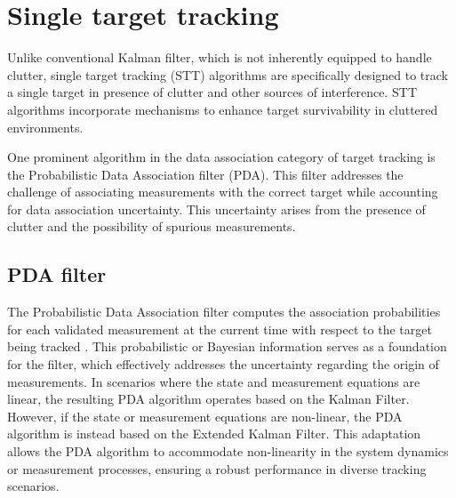 \section{Single target tracking}
Unlike conventional Kalman filter, which is not inherently equipped to handle clutter, single target tracking (STT) algorithms are specifically designed to track a single target in presence of clutter and other
sources
of interference. STT algorithms incorporate mechanisms to enhance target survivability in cluttered environments.

One prominent algorithm in the data association category of target tracking is the Probabilistic Data Association
filter (PDA). This filter addresses the challenge of associating measurements with the correct target while
accounting
for data association uncertainty. This uncertainty arises from the presence of clutter and the possibility of spurious measurements.


\subsection{PDA filter}
\label{sec:pda_filter}
The Probabilistic Data Association filter computes the association probabilities for each validated measurement at
the current time with respect to the target being tracked \cite{BarShalomPDA}. This probabilistic or Bayesian information serves as a
foundation for the filter, which effectively addresses the uncertainty regarding the origin of measurements. In
scenarios where the state and measurement equations are linear, the resulting PDA algorithm operates based on the Kalman Filter. However, if the state or measurement equations are non-linear, the PDA algorithm is instead based on the Extended Kalman Filter. This adaptation allows the PDA algorithm to accommodate non-linearity in the system dynamics or measurement processes, ensuring a robust performance in diverse tracking scenarios.

